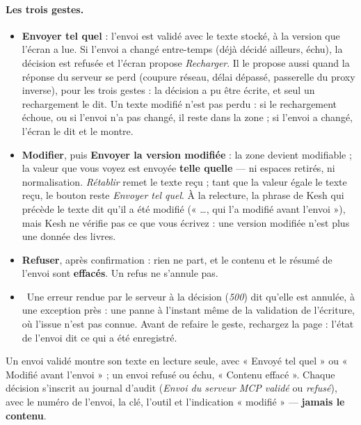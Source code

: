 \documentclass[a4paper,11pt,oneside]{article}
\begin{document}
\paragraph{Les trois gestes.}
\begin{itemize}
    \item \textbf{Envoyer tel quel} : l'envoi est validé avec le texte stocké, à la version que l'écran a lue. Si l'envoi a changé entre-temps (déjà décidé ailleurs, échu), la décision est refusée et l'écran propose \emph{Recharger}. Il le propose aussi quand la réponse du serveur se perd (coupure réseau, délai dépassé, passerelle du proxy inverse), pour les trois gestes : la décision a pu être écrite, et seul un rechargement le dit. Un texte modifié n'est pas perdu : si le rechargement échoue, ou si l'envoi n'a pas changé, il reste dans la zone ; si l'envoi a changé, l'écran le dit et le montre.
    \item \textbf{Modifier}, puis \textbf{Envoyer la version modifiée} : la zone devient modifiable ; la valeur que vous voyez est envoyée \textbf{telle quelle} --- ni espaces retirés, ni normalisation. \emph{Rétablir} remet le texte reçu ; tant que la valeur égale le texte reçu, le bouton reste \emph{Envoyer tel quel}. À la relecture, la phrase de Kesh qui précède le texte dit qu'il a été modifié (« \ldots, qui l'a modifié avant l'envoi »), mais Kesh ne vérifie pas ce que vous écrivez : une version modifiée n'est plus une donnée des livres.
    \item \textbf{Refuser}, après confirmation : rien ne part, et le contenu et le résumé de l'envoi sont \textbf{effacés}. Un refus ne s'annule pas.
    \item \keshAttention\ Une erreur rendue par le serveur à la décision (\emph{500}) dit qu'elle est annulée, à une exception près : une panne à l'instant même de la validation de l'écriture, où l'issue n'est pas connue. Avant de refaire le geste, rechargez la page : l'état de l'envoi dit ce qui a été enregistré.
\end{itemize}
Un envoi validé montre son texte en lecture seule, avec « Envoyé tel quel » ou « Modifié avant l'envoi » ; un envoi refusé ou échu, « Contenu effacé ». Chaque décision s'inscrit au journal d'audit (\emph{Envoi du serveur MCP validé} ou \emph{refusé}), avec le numéro de l'envoi, la clé, l'outil et l'indication « modifié » --- \textbf{jamais le contenu}.
\end{document}
